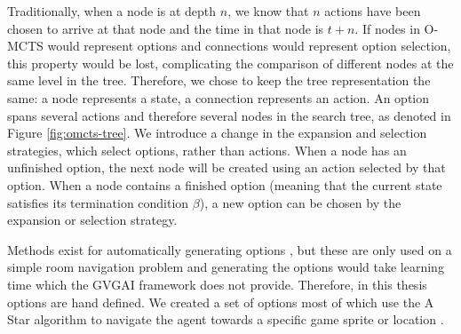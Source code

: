 Traditionally, when a node is at depth $n$, we know that $n$ actions have been
chosen to arrive at that node and the time in that node is $t+n$. If nodes in
O-MCTS would represent options and connections would represent option selection,
this property would be lost, complicating the comparison of different nodes at
the same level in the tree. Therefore, we chose to keep the tree representation
the same: a node represents a state, a connection represents an action. An
option spans several actions and therefore several nodes in the search tree, as
denoted in Figure \ref{fig:omcts-tree}. We introduce a change in the expansion
and selection strategies, which select options, rather than actions. When a node
has an unfinished option, the next node will be created using an action selected
by that option. When a node contains a finished option (meaning that the current
state satisfies its termination condition $\beta$), a new option can be chosen
by the expansion or selection strategy.

Methods exist for automatically generating options \cite{castro2012automatic},
but these are only used on a simple room navigation problem and generating the
options would take learning time which the GVGAI framework does not provide.
Therefore, in this thesis options are hand defined. We created a set of options
most of which use the A Star algorithm to navigate the agent towards a specific
game sprite or location \cite{hart1968formal}.

